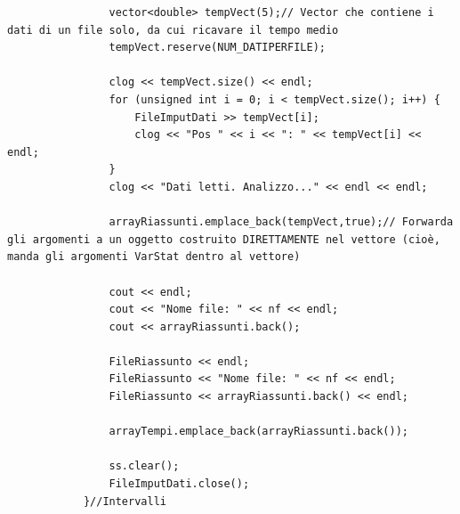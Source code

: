 \documentclass[12pt]{article} %
\begin{document}
\begin{verbatim}
				vector<double> tempVect(5);// Vector che contiene i dati di un file solo, da cui ricavare il tempo medio
				tempVect.reserve(NUM_DATIPERFILE);

				clog << tempVect.size() << endl;
				for (unsigned int i = 0; i < tempVect.size(); i++) {
					FileImputDati >> tempVect[i];
					clog << "Pos " << i << ": " << tempVect[i] << endl;
				}
				clog << "Dati letti. Analizzo..." << endl << endl;

				arrayRiassunti.emplace_back(tempVect,true);// Forwarda gli argomenti a un oggetto costruito DIRETTAMENTE nel vettore (cioè, manda gli argomenti VarStat dentro al vettore)

				cout << endl;
				cout << "Nome file: " << nf << endl;
				cout << arrayRiassunti.back();

				FileRiassunto << endl;
				FileRiassunto << "Nome file: " << nf << endl;
				FileRiassunto << arrayRiassunti.back() << endl;

				arrayTempi.emplace_back(arrayRiassunti.back());

				ss.clear();
				FileImputDati.close();
			}//Intervalli



\end{verbatim}
\end{document}
